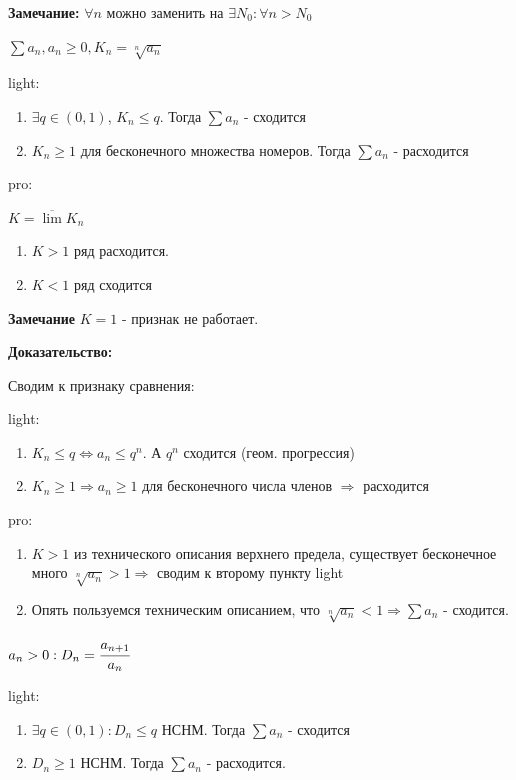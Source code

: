 \textbf{Замечание:} $\forall n$ можно заменить на $\exists N_0: \forall n >N_0$


$\sum a_n, a_n \geq 0 , K_n = \sqrt[n]{a_n}$

light:
\begin{enumerate}
    \item $\exists q \in (0,1)$, $K_n \leq q$. Тогда $\sum a_n$ - сходится
    \item $K_{n}\geq 1$ для бесконечного множества номеров. Тогда $\sum a_n$ - расходится
\end{enumerate}
pro:

$K = \overline{\lim} K_n$
\begin{enumerate}
    \item $K>1$ ряд расходится.
    \item $K<1$ ряд сходится
\end{enumerate}

\textbf{Замечание} $K=1$ - признак не работает.

\textbf{Доказательство:}

Сводим к признаку сравнения:

light: 
\begin{enumerate}
    \item $K_n\leq q \Leftrightarrow a_n \leq q^n$. А $q^n$ сходится (геом. прогрессия)
    \item  $K_n\geq 1 \Rightarrow a_n\geq 1$ для бесконечного числа членов $\Rightarrow$ расходится
\end{enumerate}

pro:
\begin{enumerate}
    \item  $K>1$ из технического описания верхнего предела, существует бесконечное много $\sqrt[n]{a_n }>1 \Rightarrow$ сводим к второму пункту light
    \item Опять пользуемся техническим описанием, что $\sqrt[n]{a_n}<1 \Rightarrow \sum a_n$ - сходится.
\end{enumerate}


$a_n > 0: D_n = \cfrac{a_{n+1}}{a_n}$

light: 
\begin{enumerate}
    \item $\exists q \in (0,1): D_n \leq q$ НСНМ. Тогда $\sum a_n$ - сходится
    \item $D_n \geq 1$ НСНМ. Тогда $\sum a_n$ - расходится.
\end{enumerate}

